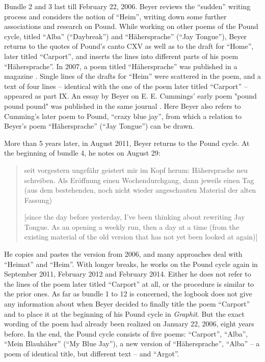 \documentclass{article}
\begin{document}
Bundle 2 and 3 last till February 22, 2006. Beyer reviews the ``sudden''
writing process and considers the notion of ``Heim'', writing down some
further associations and research on Pound. While working on other poems
of the Pound cycle, titled ``Alba'' (``Daybreak'') and ``Hähersprache'' (``Jay
Tongue''), Beyer returns to the quotes of Pound's canto CXV as well as to
the draft for ``Home'', later titled ``Carport'', and inserts the lines
into different parts of his poem ``Hähersprache''. In 2007, a poem
titled ``Hähersprache'' was published in a magazine \parencite{beyer_hahersprache_2007}.
Single lines of the drafts for ``Heim'' were scattered in the poem, and
a text of four lines -- identical with the one of the poem later titled
``Carport'' -- appeared as part IX. An essay by Beyer on E. E. Cummings'
early poem "pound pound pound" was published in the same journal \citep{beyer_zu_2007}. Here Beyer also refers to Cumming's later poem to Pound,
``crazy blue jay'', from which a relation to Beyer's poem
``Hähersprache'' (``Jay Tongue'') can be drawn.

More than 5 years later, in August 2011, Beyer returns to the Pound cycle. At
the beginning of bundle 4, he notes on August 29:

\begin{quote}
seit vorgestern ungefähr geistert mir im Kopf herum: Hähersprache neu
schreiben. Als Eröffnung einen Wochendurchgang, dann jeweils einen Tag
(aus dem bestehenden, noch nicht wieder angeschauten Material der alten
Fassung)

\vspace{1em}

[since the day before yesterday, I've been thinking about rewriting Jay
Tongue. As an opening a weekly run, then a day at a time (from the
existing material of the old version that has not yet been looked at
again)]
\end{quote}

He copies and pastes the version from 2006, and many approaches deal
with ``Heimat'' and ``Heim''. With longer breaks, he works on the Pound
cycle again in September 2011, February 2012 and February 2014. Either
he does not refer to the lines of the poem later titled ``Carport'' at
all, or the procedure is similar to the prior ones. As far as bundle 1
to 12 is concerned, the logbook does not give any information about when
Beyer decided to finally title the poem ``Carport'' and to place it at
the beginning of his Pound cycle in \emph{Graphit}. But the exact
wording of the poem had already been realized on January 22, 2006, eight
years before. In the end, the Pound cycle consists of five poems:
``Carport'', ``Alba'', ``Mein Blauhäher'' (``My Blue Jay''), a new version
of ``Hähersprache'', ``Alba'' -- a poem of identical title, but different
text -- and ``Argot''.
\end{document}

